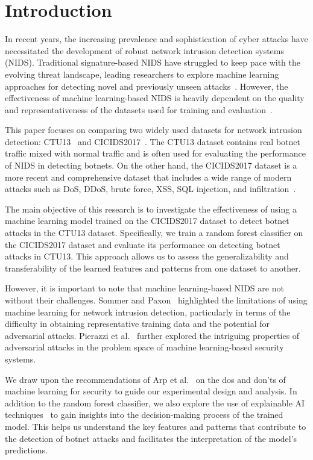 \chapter{Introduction}

In recent years, the increasing prevalence and sophistication of cyber attacks have necessitated the development of robust network intrusion detection systems (NIDS). Traditional signature-based NIDS have struggled to keep pace with the evolving threat landscape, leading researchers to explore machine learning approaches for detecting novel and previously unseen attacks~\cite{marchetti2016analysis}. However, the effectiveness of machine learning-based NIDS is heavily dependent on the quality and representativeness of the datasets used for training and evaluation~\cite{engelen2021troubleshooting}.

This paper focuses on comparing two widely used datasets for network intrusion detection: CTU13~\cite{garcia2014empirical} and CICIDS2017~\cite{sharafaldin2018toward}. The CTU13 dataset contains real botnet traffic mixed with normal traffic and is often used for evaluating the performance of NIDS in detecting botnets. On the other hand, the CICIDS2017 dataset is a more recent and comprehensive dataset that includes a wide range of modern attacks such as DoS, DDoS, brute force, XSS, SQL injection, and infiltration~\cite{sharafaldin2018toward}.

The main objective of this research is to investigate the effectiveness of using a machine learning model trained on the CICIDS2017 dataset to detect botnet attacks in the CTU13 dataset. Specifically, we train a random forest classifier on the CICIDS2017 dataset and evaluate its performance on detecting botnet attacks in CTU13. This approach allows us to assess the generalizability and transferability of the learned features and patterns from one dataset to another.

However, it is important to note that machine learning-based NIDS are not without their challenges. Sommer and Paxon~\cite{sommer2010outside} highlighted the limitations of using machine learning for network intrusion detection, particularly in terms of the difficulty in obtaining representative training data and the potential for adversarial attacks. Pierazzi et al.~\cite{pierazzi2020intriguing} further explored the intriguing properties of adversarial attacks in the problem space of machine learning-based security systems.

We draw upon the recommendations of Arp et al.~\cite{arp2022and} on the dos and don'ts of machine learning for security to guide our experimental design and analysis. In addition to the random forest classifier, we also explore the use of explainable AI techniques~\cite{warnecke2020evaluating} to gain insights into the decision-making process of the trained model. This helps us understand the key features and patterns that contribute to the detection of botnet attacks and facilitates the interpretation of the model's predictions.